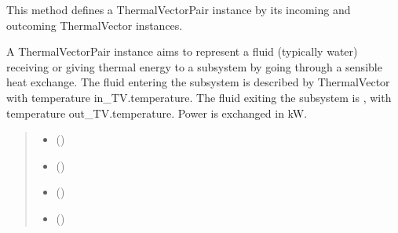 \documentclass[letterpaper,10pt,english]{sphinxmanual}
\begin{document}
\begin{fulllineitems}
\label{\detokenize{generated/tamos.element.fetch_TVP:tamos.element.fetch_TVP}}
\pysigstartsignatures
{}
\pysigstopsignatures
\sphinxAtStartPar
This method defines a ThermalVectorPair instance by its incoming and outcoming ThermalVector instances.

\sphinxAtStartPar
A ThermalVectorPair instance aims to represent a fluid (typically water) receiving or giving thermal energy
to a subsystem by going through a sensible heat exchange. The fluid entering the subsystem is described by ThermalVector
 with temperature in\_TV.temperature. The fluid exiting the subsystem is , with temperature out\_TV.temperature.
Power is exchanged in kW.
\begin{quote}\begin{description}
\begin{itemize}
\item {} 
\sphinxAtStartPar
{} ({\hyperref[\detokenize{generated/tamos.element.ThermalVector:tamos.element.ThermalVector}]{}}) \textendash{} 

\item {} 
\sphinxAtStartPar
{} ({\hyperref[\detokenize{generated/tamos.element.ThermalVector:tamos.element.ThermalVector}]{}}) \textendash{} 

\item {} 
\sphinxAtStartPar
{} (\sphinxstyleliteralemphasis{\sphinxupquote{, }}\sphinxstyleliteralemphasis{\sphinxupquote{, }}) \textendash{} 

\item {} 
\sphinxAtStartPar
{} (\sphinxstyleliteralemphasis{\sphinxupquote{, }}) \textendash{} 


\end{itemize}
\end{description}
\end{quote}
\end{fulllineitems}
\end{document}
